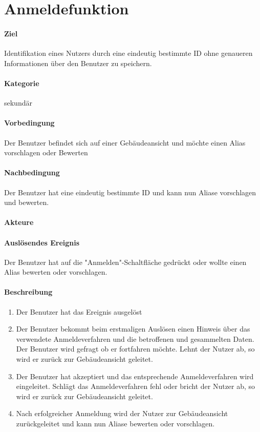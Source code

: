 \section{Anmeldefunktion}
\label{Anmeldefunktion}
\paragraph{Ziel}
Identifikation eines Nutzers durch eine eindeutig bestimmte ID ohne genaueren Informationen über den Benutzer zu speichern.
\paragraph{Kategorie}
sekundär
\paragraph{Vorbedingung}
Der Benutzer befindet sich auf einer Gebäudeansicht und möchte einen Alias vorschlagen oder Bewerten
\paragraph{Nachbedingung}
Der Benutzer hat eine eindeutig bestimmte ID und kann nun Aliase vorschlagen und bewerten.
\paragraph{Akteure}

\paragraph{Auslösendes Ereignis}
Der Benutzer hat auf die "Anmelden"-Schaltfläche gedrückt oder wollte einen Alias bewerten oder vorschlagen.
\paragraph{Beschreibung}
\begin{enumerate}
    \item Der Benutzer hat das Ereignis ausgelöst
    \item Der Benutzer bekommt beim erstmaligen Auslösen einen Hinweis über das verwendete Anmeldeverfahren und die betroffenen und gesammelten Daten.
          Der Benutzer wird gefragt ob er fortfahren möchte.
          \subitem Lehnt der Nutzer ab, so wird er zurück zur Gebäudeansicht geleitet.
    \item Der Benutzer hat akzeptiert und das entsprechende Anmeldeverfahren wird eingeleitet.
          \subitem Schlägt das Anmeldeverfahren fehl oder bricht der Nutzer ab, so wird er zurück zur Gebäudeansicht geleitet.
    \item Nach erfolgreicher Anmeldung wird der Nutzer zur Gebäudeansicht zurückgeleitet und kann nun Aliase bewerten oder vorschlagen.
\end{enumerate}